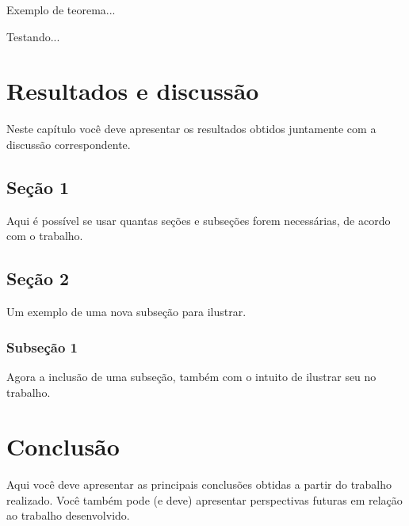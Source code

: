 \documentclass[article,12pt,oneside,a4paper,chapter=TITLE,
			   english,brazil]{abntex2}
\begin{document}
Exemplo de teorema...
\begin{teorema}
	Testando...
\end{teorema}

\vspace{\onelineskip}


\chapter{Resultados e discussão}

Neste capítulo você deve apresentar os resultados obtidos juntamente com a discussão correspondente.


\section{Seção 1}

Aqui é possível se usar quantas seções e subseções forem necessárias, de acordo com o trabalho.

\section{Seção 2}

Um exemplo de uma nova subseção para ilustrar.


\subsection{Subseção 1}

Agora a inclusão de uma subseção, também com o intuito de ilustrar seu no trabalho.

\vspace{\onelineskip}


\chapter{Conclusão}

Aqui você deve apresentar as principais conclusões obtidas a partir do trabalho realizado. Você também pode (e deve) apresentar perspectivas futuras em relação ao trabalho desenvolvido.
\vspace{\onelineskip}
\end{document}
